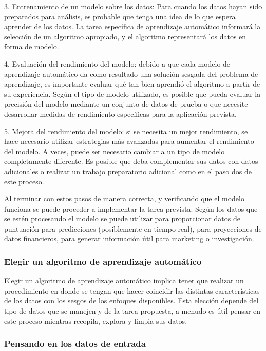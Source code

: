 \documentclass[
  letterpaper,
  DIV=11,
  numbers=noendperiod]{scrartcl}
\begin{document}
3. Entrenamiento de un modelo sobre los datos: Para cuando los datos
hayan sido preparados para análisis, es probable que tenga una idea de
lo que espera aprender de los datos. La tarea específica de aprendizaje
automático informará la selección de un algoritmo apropiado, y el
algoritmo representará los datos en forma de modelo.

4. Evaluación del rendimiento del modelo: debido a que cada modelo de
aprendizaje automático da como resultado una solución sesgada del
problema de aprendizaje, es importante evaluar qué tan bien aprendió el
algoritmo a partir de su experiencia. Según el tipo de modelo utilizado,
es posible que pueda evaluar la precisión del modelo mediante un
conjunto de datos de prueba o que necesite desarrollar medidas de
rendimiento específicas para la aplicación prevista.

5. Mejora del rendimiento del modelo: si se necesita un mejor
rendimiento, se hace necesario utilizar estrategias más avanzadas para
aumentar el rendimiento del modelo. A veces, puede ser necesario cambiar
a un tipo de modelo completamente diferente. Es posible que deba
complementar sus datos con datos adicionales o realizar un trabajo
preparatorio adicional como en el paso dos de este proceso.

Al terminar con estos pasos de manera correcta, y verificando que el
modelo funciona se puede proceder a implementar la tarea prevista. Según
los datos que se estén procesando el modelo se puede utilizar para
proporcionar datos de puntuación para predicciones (posiblemente en
tiempo real), para proyecciones de datos financieros, para generar
información útil para marketing o investigación.

\hypertarget{elegir-un-algoritmo-de-aprendizaje-automuxe1tico}{%
\subsubsection{Elegir un algoritmo de aprendizaje
automático}\label{elegir-un-algoritmo-de-aprendizaje-automuxe1tico}}

Elegir un algoritmo de aprendizaje automático implica tener que realizar
un procedimiento en donde se tengan que hacer coincidir las distintas
características de los datos con los sesgos de los enfoques disponibles.
Esta elección depende del tipo de datos que se manejen y de la tarea
propuesta, a menudo es útil pensar en este proceso mientras recopila,
explora y limpia sus datos.

\hypertarget{pensando-en-los-datos-de-entrada}{%
\subsubsection{Pensando en los datos de
entrada}\label{pensando-en-los-datos-de-entrada}}
\end{document}
